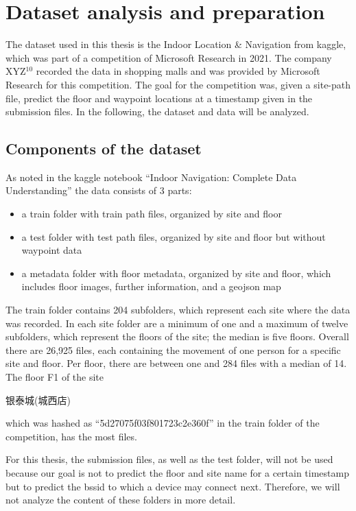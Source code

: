 \chapter{Dataset analysis and preparation}\label{sec:data-ana}

The dataset used in this thesis is the Indoor Location \& Navigation from kaggle\cite{kaggle}, which was part of a competition of Microsoft Research in 2021\cite{IndoorLocationNavigation}.
The company XYZ\(^{10}\) recorded the data in shopping malls and was provided by Microsoft Research for this competition.
The goal for the competition was, given a site-path file, predict the floor and waypoint locations at a timestamp given in the submission files.
In the following, the dataset and data will be analyzed.


\section{Components of the dataset}\label{sec:data}
As noted in the kaggle notebook ``Indoor Navigation: Complete Data Understanding'' \cite{IndoorNavigationUnderstanding} the data consists of 3 parts:

\begin{itemize}
    \item a train folder with train path files, organized by site and floor
    \item a test folder with test path files, organized by site and floor but without waypoint data
    \item a metadata folder with floor metadata, organized by site and floor, which includes floor images, further information, and a geojson map
\end{itemize}

The train folder contains 204 subfolders, which represent each site where the data was recorded.
In each site folder are a minimum of one and a maximum of twelve subfolders, which represent the floors of the site; the median is five floors.
Overall there are 26,925 files, each containing the movement of one person for a specific site and floor.
Per floor, there are between one and 284 files with a median of 14.
The floor F1 of the site \begin{CJK*}{UTF8}{gbsn}银泰城(城西店)\end{CJK*} which was hashed as ``5d27075f03f801723c2e360f'' in the train folder of the competition, has the most files.

For this thesis, the submission files, as well as the test folder, will not be used because our goal is not to predict the floor and site name for a certain timestamp but to predict the \ac{bssid} to which a device may connect next.
Therefore, we will not analyze the content of these folders in more detail.

